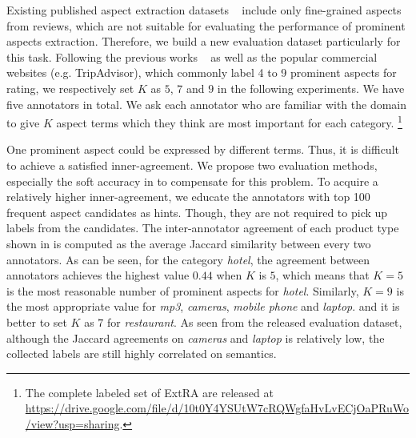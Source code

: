 \label{sec:evaldataset}
Existing published aspect extraction datasets ~\cite{hu2004mining,popescu2007extracting,pavlopoulos2014aspect,ding2008holistic} 
include only fine-grained aspects from reviews,
which are not suitable for evaluating the performance of 
prominent aspects extraction. 
Therefore, we build a new evaluation dataset particularly 
for this task.
Following the previous works 
~\cite{ganu2009beyond,brody2010unsupervised,zhao2010jointly,wang2015sentiment} as well as
the popular commercial websites (e.g. TripAdvisor), 
which commonly label 4 to 9 prominent aspects for
rating, we respectively set $K$ as $5$, $7$ and $9$
in the following experiments.
We have five annotators in total.
We ask each annotator who are familiar with the domain 
to give $K$ aspect terms which they think are most important
for each category. 
\footnote{The 
	complete labeled set of ExtRA are released at \url{https://drive.google.com/file/d/10t0Y4YSUtW7cRQWgfaHvLvECjOaPRuWo/view?usp=sharing}.
}

One prominent aspect could be expressed by different terms.
Thus, it is difficult to achieve a satisfied inner-agreement.
We propose two evaluation methods, especially the 
soft accuracy in  to compensate for this problem.
To acquire a relatively higher inner-agreement, 
we educate the annotators with top 100 frequent aspect candidates
as hints. Though, they are not required to pick up labels from 
the candidates.
The inter-annotator agreement of each
product type shown in  is computed as the average Jaccard similarity between every two annotators.
As can be seen, for the category \textit{hotel},
the agreement between annotators 
achieves the highest value $0.44$ when $K$ is $5$,
which means that $K=5$ is the most reasonable 
number of prominent aspects for \textit{hotel}.
Similarly, $K=9$ is the most appropriate value for
\textit{mp3}, \textit{cameras}, \textit{mobile phone} and \textit{laptop}.
and it is better to set $K$ as $7$ for \textit{restaurant}.
As seen from the released evaluation dataset,
although the Jaccard agreements on \textit{cameras}
and \textit{laptop} is relatively low,
the collected labels are still highly correlated on semantics.

